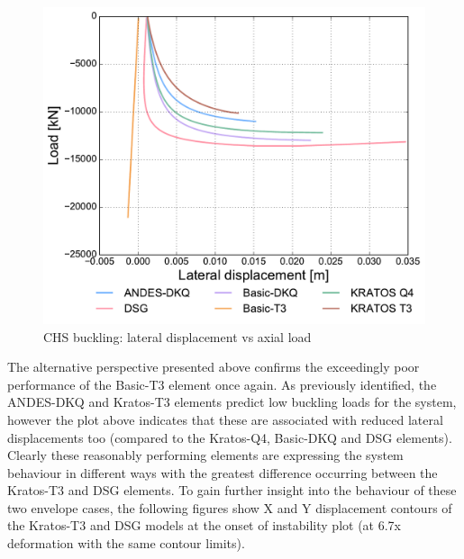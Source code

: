 \begin{figure}[H]
	\centering
	\def\svgwidth{\columnwidth}
	\includegraphics[width=12cm]{images/stability_chs_trans_disp.pdf}
	\caption{CHS buckling: lateral displacement vs axial load}
	\label{pic:eulerchs2}
\end{figure}

The alternative perspective presented above confirms the exceedingly poor performance of the Basic-T3 element once again. As previously identified, the ANDES-DKQ and Kratos-T3 elements predict low buckling loads for the system, however the plot above indicates that these are associated with reduced lateral displacements too (compared to the Kratos-Q4, Basic-DKQ and DSG elements). Clearly these reasonably performing elements are expressing the system behaviour in different ways with the greatest difference occurring between the Kratos-T3 and DSG elements. To gain further insight into the behaviour of these two envelope cases, the following figures show X and Y displacement contours of the Kratos-T3 and DSG models at the onset of instability plot (at 6.7x deformation with the same contour limits).


